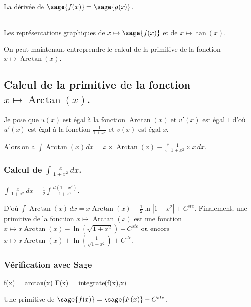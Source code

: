 \documentclass[a4paper,12pt]{report}
\renewcommand{\arctan}{\mathop{\mathrm{Arc\mspace{2mu}tan}}}
\begin{document}
La dérivée de $\sage{f(x)} = \sage{g(x)} $.


\begin{center}
\\
Les représentations graphiques de $x \mapsto \sage{f(x)} $ et de $x\mapsto \tan(x)$.
\end{center}


On peut maintenant entreprendre le calcul de la primitive de la  fonction  $x \mapsto \arctan(x) $.


\subsection{Calcul de la primitive de la fonction  $x \mapsto \arctan(x) $.}


Je pose que $u(x)$  est égal à la fonction $\arctan(x)$ et $v'(x)$ est égal $1$  d'où $u'(x)$  est égal à la fonction $ \frac{1}{1+ x^2} $ et $v(x)$ est égal $x$.

Alors on a $\int \arctan(x) \, dx = x \times \arctan(x) -\int \frac{1}{1+x^2} \times x \, dx $.

\subsubsection{Calcul de $\int \frac{x}{1+ x^2} \, dx $.}

$\int \frac{x}{1+ x^2} \, dx = \frac{1}{2} \int \frac{d(1+x^2)}{1+ x^2} $.

D'où $\int \arctan(x) \, dx = x \arctan(x) - \frac{1}{2} \ln \left| 1+ x^2 \right| + C^{ste} $. 
Finalement, une primitive de la fonction $x \mapsto \arctan(x) $ est une fonction $x \mapsto x \arctan(x) -\ln\left( \sqrt{1+ x^2}\right) + C^{ste} $ ou encore $x \mapsto x \arctan(x) +\ln\left( \frac{1}{\sqrt{1+ x^2}}\right) + C^{ste} $.


\subsubsection{Vérification avec Sage}

\begin{sageblock}
    f(x) = arctan(x)
    F(x) = integrate(f(x),x)
\end{sageblock}

Une primitive de $\sage{f(x)} = \sage{F(x)} + C^{ste}$.

\end{document}
